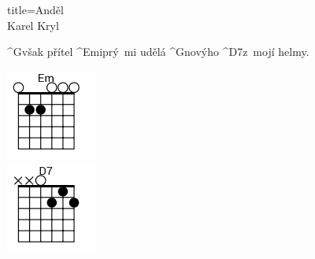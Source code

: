 \begin{song}{title=\predtitle \centering Anděl \\\large Karel Kryl   \vspace*{-0.3cm}}
\begin{centerjustified}
\begin{minipage}{0.65\textwidth}
	^{G\z}však přítel ^{Emi\z}prý~mi udělá ^{G\z}novýho ^{D7}z~mojí helmy.
\end{minipage}
\begin{minipage}{0.1\textwidth}
\includegraphics[width=3cm]{../Akordy/em.png}\\
\includegraphics[width=3cm]{../Akordy/d7.png}
\end{minipage}



\end{centerjustified}
\setcounter{Slokočet}{0}
\end{song}
